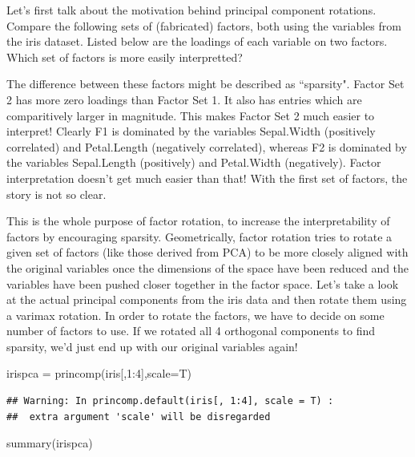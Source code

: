 \documentclass[
]{article}
\newenvironment{Shaded}{\begin{snugshade}}{\end{snugshade}}
\newcommand{\AttributeTok}[1]{\textcolor[rgb]{0.77,0.63,0.00}{#1}}
\newcommand{\DecValTok}[1]{\textcolor[rgb]{0.00,0.00,0.81}{#1}}
\newcommand{\FunctionTok}[1]{\textcolor[rgb]{0.00,0.00,0.00}{#1}}
\newcommand{\NormalTok}[1]{#1}
\newcommand{\OtherTok}[1]{\textcolor[rgb]{0.56,0.35,0.01}{#1}}
\newcommand{\SpecialCharTok}[1]{\textcolor[rgb]{0.00,0.00,0.00}{#1}}
\theoremstyle{definition}
\theoremstyle{definition}
\theoremstyle{definition}
\theoremstyle{definition}
\theoremstyle{remark}
\begin{document}
Let's first talk about the motivation behind principal component rotations. Compare the following sets of (fabricated) factors, both using the variables from the iris dataset. Listed below are the loadings of each variable on two factors. Which set of factors is more easily interpretted?

The difference between these factors might be described as ``sparsity". Factor Set 2 has more zero loadings than Factor Set 1. It also has entries which are comparitively larger in magnitude. This makes Factor Set 2 much easier to interpret! Clearly F1 is dominated by the variables Sepal.Width (positively correlated) and Petal.Length (negatively correlated), whereas F2 is dominated by the variables Sepal.Length (positively) and Petal.Width (negatively). Factor interpretation doesn't get much easier than that! With the first set of factors, the story is not so clear.

This is the whole purpose of factor rotation, to increase the interpretability of factors by encouraging sparsity. Geometrically, factor rotation tries to rotate a given set of factors (like those derived from PCA) to be more closely aligned with the original variables once the dimensions of the space have been reduced and the variables have been pushed closer together in the factor space. Let's take a look at the actual principal components from the iris data and then rotate them using a varimax rotation. In order to rotate the factors, we have to decide on some number of factors to use. If we rotated all 4 orthogonal components to find sparsity, we'd just end up with our original variables again!

\begin{Shaded}
\begin{Highlighting}[]
\NormalTok{irispca }\OtherTok{=} \FunctionTok{princomp}\NormalTok{(iris[,}\DecValTok{1}\SpecialCharTok{:}\DecValTok{4}\NormalTok{],}\AttributeTok{scale=}\NormalTok{T)}
\end{Highlighting}
\end{Shaded}

\begin{verbatim}
## Warning: In princomp.default(iris[, 1:4], scale = T) :
##  extra argument 'scale' will be disregarded
\end{verbatim}

\begin{Shaded}
\begin{Highlighting}[]
\FunctionTok{summary}\NormalTok{(irispca)}
\end{Highlighting}
\end{Shaded}
\end{document}
